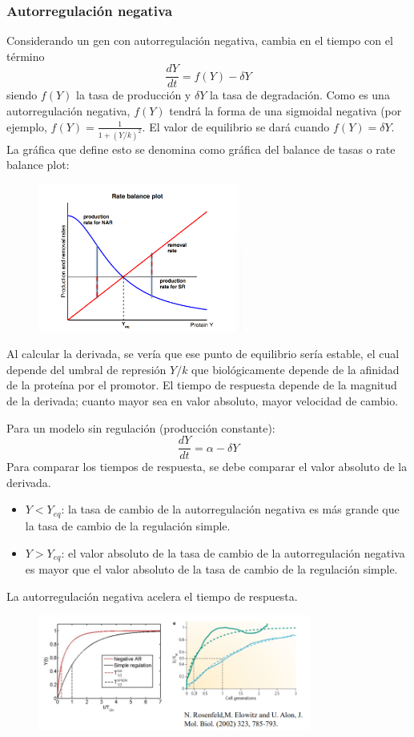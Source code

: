 \subsubsection{Autorregulación negativa}
Considerando un gen con autorregulación negativa, cambia en el tiempo con el término
$$\frac{dY}{dt} = f(Y) - \delta Y$$
siendo $f(Y)$ la tasa de producción y $\delta Y$ la tasa de degradación. Como es una autorregulación negativa, $f(Y)$ tendrá la forma de una sigmoidal negativa (por ejemplo, $f(Y) = \frac{1}{1 + (Y/k)^2}$. El valor de equilibrio se dará cuando $f(Y) = \delta Y$. La gráfica que define esto se denomina como gráfica del balance de tasas o rate balance plot:
\begin{figure}[h]
\centering
\includegraphics[width = 0.6\textwidth]{figs/rate-balance-plot.png}
\end{figure}

Al calcular la derivada, se vería que ese punto de equilibrio sería estable, el cual depende del umbral de represión $Y/k$ que biológicamente depende de la afinidad de la proteína por el promotor. El tiempo de respuesta depende de la magnitud de la derivada; cuanto mayor sea en valor absoluto, mayor velocidad de cambio.

Para un modelo sin regulación (producción constante):
$$\frac{dY}{dt} = \alpha - \delta Y$$
Para comparar los tiempos de respuesta, se debe comparar el valor absoluto de la derivada.
\begin{itemize}
\item $Y < Y_{eq}$: la tasa de cambio de la autorregulación negativa es más grande que la tasa de cambio de la regulación simple.
\item $Y > Y_{eq}$: el valor absoluto de la tasa de cambio de la autorregulación negativa es mayor que el valor absoluto de la tasa de cambio de la regulación simple. 
\end{itemize}

La autorregulación negativa acelera el tiempo de respuesta.
\begin{figure}[h]
\centering
\includegraphics[width = 0.8\textwidth]{figs/nar.png}
\end{figure}

